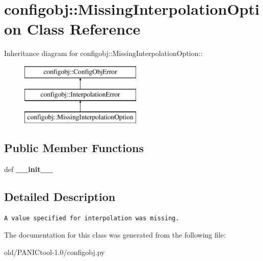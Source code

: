 \section{configobj::Missing\-Interpolation\-Option Class Reference}
\label{classconfigobj_1_1MissingInterpolationOption}
Inheritance diagram for configobj::Missing\-Interpolation\-Option::\begin{figure}[H]
\begin{center}
\leavevmode
\includegraphics[height=3cm]{classconfigobj_1_1MissingInterpolationOption}
\end{center}
\end{figure}
\subsection*{Public Member Functions}
\begin{CompactItemize}
\item 
def \textbf{\_\-\_\-init\_\-\_\-}\label{classconfigobj_1_1MissingInterpolationOption_1cf2aab1dcc3b34cee7b65443c08d645}

\end{CompactItemize}


\subsection{Detailed Description}


\footnotesize\begin{verbatim}A value specified for interpolation was missing.\end{verbatim}
\normalsize
 



The documentation for this class was generated from the following file:\begin{CompactItemize}
\item 
old/PANICtool-1.0/configobj.py\end{CompactItemize}

